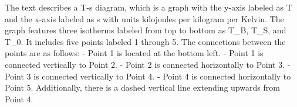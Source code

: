 The text describes a T-s diagram, which is a graph with the y-axis labeled as T and the x-axis labeled as s with units kilojoules per kilogram per Kelvin. The graph features three isotherms labeled from top to bottom as T_B, T_S, and T_0. It includes five points labeled 1 through 5. The connections between the points are as follows:
- Point 1 is located at the bottom left.
- Point 1 is connected vertically to Point 2.
- Point 2 is connected horizontally to Point 3.
- Point 3 is connected vertically to Point 4.
- Point 4 is connected horizontally to Point 5.
Additionally, there is a dashed vertical line extending upwards from Point 4.